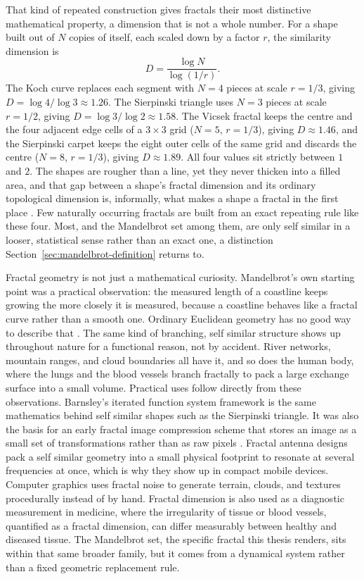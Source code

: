\documentclass{ftndiplomski}
\begin{document}
That kind of repeated construction gives fractals their most distinctive mathematical property, a
dimension that is not a whole number. For a shape built out of $N$ copies of itself, each scaled
down by a factor $r$, the similarity dimension is
\begin{equation}
  \label{eq:similarity-dimension}
  D = \frac{\log N}{\log(1/r)}.
\end{equation}
The Koch curve replaces each segment with $N=4$ pieces at scale $r=1/3$, giving $D = \log 4 / \log
3 \approx 1.26$. The Sierpinski triangle uses $N=3$ pieces at scale $r=1/2$, giving $D = \log 3 /
\log 2 \approx 1.58$. The Vicsek fractal keeps the centre and the four adjacent edge cells of a
$3\times3$ grid ($N=5$, $r=1/3$), giving $D \approx 1.46$, and the Sierpinski carpet keeps the
eight outer cells of the same grid and discards the centre ($N=8$, $r=1/3$), giving $D \approx
1.89$. All four values sit strictly between $1$ and $2$. The shapes are rougher than a line, yet
they never thicken into a filled area, and that gap between a shape's fractal dimension and its
ordinary topological dimension is, informally, what makes a shape a fractal in the first place
\cite{falconer2014}. Few naturally occurring fractals are built from an exact repeating rule like
these four. Most, and the Mandelbrot set among them, are only self similar in a looser, statistical
sense rather than an exact one, a distinction Section~\ref{sec:mandelbrot-definition} returns to.

Fractal geometry is not just a mathematical curiosity. Mandelbrot's own starting point was a
practical observation: the measured length of a coastline keeps growing the more closely it is
measured, because a coastline behaves like a fractal curve rather than a smooth one. Ordinary
Euclidean geometry has no good way to describe that \cite{mandelbrot1982}. The same kind of
branching, self similar structure shows up throughout nature for a functional reason, not by
accident. River networks, mountain ranges, and cloud boundaries all have it, and so does the human
body, where the lungs and the blood vessels branch fractally to pack a large exchange surface into
a small volume. Practical uses follow directly from these observations. Barnsley's iterated
function system framework is the same mathematics behind self similar shapes such as the
Sierpinski triangle. It was also the basis for an early fractal image compression scheme that
stores an image as a small set of transformations rather than as raw pixels \cite{barnsley1988}. Fractal antenna
designs pack a self similar geometry into a small physical footprint to resonate at several
frequencies at once, which is why they show up in compact mobile devices. Computer graphics uses
fractal noise to generate terrain, clouds, and textures procedurally instead of by hand. Fractal
dimension is also used as a diagnostic measurement in medicine, where the irregularity of tissue or
blood vessels, quantified as a fractal dimension, can differ measurably between healthy and
diseased tissue. The Mandelbrot set, the specific fractal this thesis renders, sits within that same
broader family, but it comes from a dynamical system rather than a fixed geometric replacement
rule.
\end{document}

